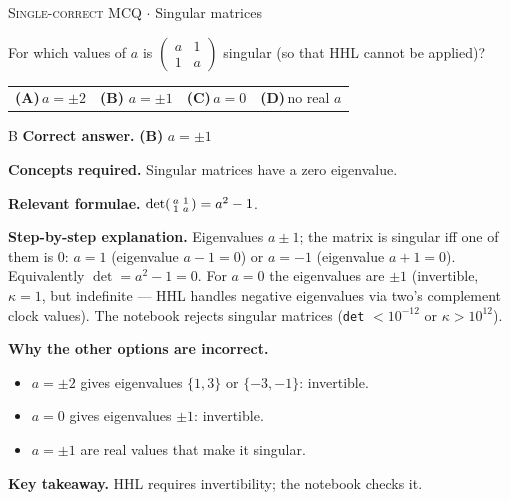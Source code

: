\documentclass[11pt,a4paper]{article}
\newcommand{\optlabel}[1]{\textbf{(#1)}}
\newcommand{\correctlabel}[1]{\textcolor{okgreen}{\textbf{(#1)}\,\ding{51}}}
\newenvironment{qitem}[1]{\begin{list}{}{\setlength{\leftmargin}{3.3em}\setlength{\labelwidth}{3.1em}%
  \setlength{\labelsep}{0.2em}\setlength{\topsep}{3pt}\setlength{\parsep}{3pt}}\item[\textbf{Q.#1}\hfill]}{\end{list}}
\newcommand{\qsep}{\par\vspace{2pt}{\color{black!15}\hrule}\vspace{4pt}}
\newcommand{\qmeta}[2]{{\footnotesize\color{black!60}\textsc{#1} \;$\cdot$\; #2}\par}
\begin{document}
\begin{qitem}{19}
\qmeta{Single-correct MCQ}{Singular matrices}
For which values of $a$ is $\begin{pmatrix}a & 1\\ 1 & a\end{pmatrix}$ singular (so that HHL cannot be applied)?
\par\smallskip\noindent\begin{tabularx}{\linewidth}{@{}*{4}{L}@{}}
\optlabel{A}\,$a = \pm2$ & \correctlabel{B}\,$a = \pm1$ & \optlabel{C}\,$a = 0$ & \optlabel{D}\,no real $a$
\end{tabularx}
\end{qitem}
\begin{solbox}{B}
\textbf{\color{brand}Correct answer.} \textcolor{okgreen}{\textbf{(B)}} $a = \pm1$

\textbf{\color{brand}Concepts required.} Singular matrices have a zero eigenvalue.

\textbf{\color{brand}Relevant formulae.} $\det\begin{psmallmatrix}a&1\\1&a\end{psmallmatrix} = a^2 - 1$.

\textbf{\color{brand}Step-by-step explanation.} Eigenvalues $a \pm 1$; the matrix is singular iff one of them is $0$: $a = 1$ (eigenvalue $a - 1 = 0$) or $a = -1$ (eigenvalue $a + 1 = 0$). Equivalently $\det = a^2 - 1 = 0$.
For $a = 0$ the eigenvalues are $\pm1$ (invertible, $\kappa = 1$, but indefinite --- HHL handles negative eigenvalues via two's complement clock values).
The notebook rejects singular matrices (\texttt{det} $< 10^{-12}$ or $\kappa > 10^{12}$).

\textbf{\color{brand}Why the other options are incorrect.}
\begin{itemize}[leftmargin=2.4em, itemsep=1pt, topsep=2pt]
\item[\textbf{(A)}] $a = \pm2$ gives eigenvalues $\{1, 3\}$ or $\{-3, -1\}$: invertible.
\item[\textbf{(C)}] $a = 0$ gives eigenvalues $\pm1$: invertible.
\item[\textbf{(D)}] $a = \pm1$ are real values that make it singular.
\end{itemize}
\textbf{\color{brand}Key takeaway.} HHL requires invertibility; the notebook checks it.
\end{solbox}
\qsep
\end{document}
